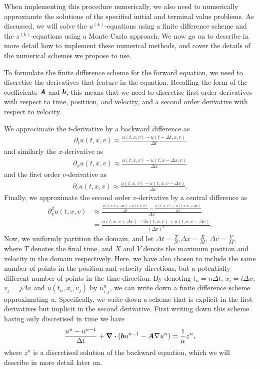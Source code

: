 \documentclass{article}  %
\begin{document}
When implementing this procedure numerically, we also need to numerically approxiamte the solutions of the specified initial and terminal value problems. As discussed, we will solve the $u^{(k)}$-equations using a finite difference scheme and the $z^{(k)}$-equations using a Monte Carlo approach. We now go on to describe in more detail how to implement these numerical methods, and cover the details of the numerical schemes we propose to use.

To formulate the finite difference scheme for the forward equation, we need to discretise the derivatives that feature in the equation. Recalling the form of the coefficients $\boldsymbol{A}$ and $\boldsymbol{b}$, this means that we need to discretise first order derivatives with respect to time, positiion, and velocity, and a second order derivative with respect to velocity.

We approcimate the $t$-derivative by a backward difference as
%
\begin{align} 
    \partial_t u(t,x,v) \approx \frac{u(t,x,v) - u(t-\Delta t,x,v)}{\Delta t}
\end{align}
%
and similarly the $x$-derivative as
%
\begin{align} 
    \partial_x u(t,x,v) \approx \frac{u(t,x,v) - u(t,x-\Delta x,v)}{\Delta x}
\end{align}
%
and the first order $v$-derivative as
%
\begin{align} 
    \partial_v u(t,x,v) \approx \frac{u(t,x,v) - u(t,x,v-\Delta v)}{\Delta v}.
\end{align}
%
Finally, we approximate the second order $v$-derivative by a central difference as
%
\begin{align} 
    \partial^2_v u(t,x,v) &\approx \frac{\frac{u(t,x,v+\Delta v)-u(t,x,v)}{\Delta v}-\frac{u(t,x,v)-u(t,x,v-\Delta v)}{\Delta v}}{\Delta v}\\
    &= \frac{u(t,x,v+\Delta v)- 2 u(t,x,v) + u(t,x,v-\Delta v)}{{(\Delta v)}^2}.
\end{align}
%
Now, we uniformly partition the domain, and let $\Delta t = \frac{T}{N}$,$\Delta x = \frac{X}{M}$, $\Delta v = \frac{V}{M}$, where $T$ denotes the final time, and $X$ and $V$ denote the maximum position and velocity in the domain respectively. Here, we have also chosen to include the same number of points in the position and velocity directions, but a potentially different number of points in the time direction. By denoting  $t_n=n\Delta t$, $x_i=i\Delta x$,$v_j=j\Delta v$ and $u(t_n,x_i,v_j)$ by $u^n_{i,j}$, we can write down a finite difference scheme approximating $u$. Specifically, we write down a scheme that is explicit in the first derivatives but implicit in the second derivative. First writing down this scheme having only discretised in time we have
%
\begin{align} %
    \frac{u^n-u^{n-1}}{\Delta t} + \div{(\vecbf{b}u^{n-1} - \vecbf{A} \nabla u^n)} = \frac{1}{\alpha} z^n,
\end{align}
%
where $z^n$ is a discretised solution of the backward equation, which we will describe in more detail later on.
\end{document}
